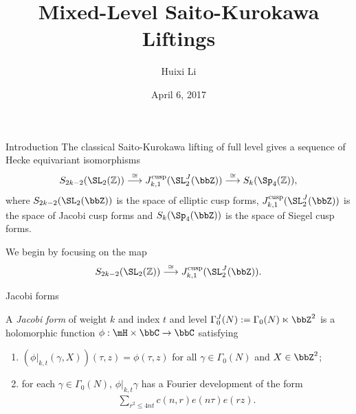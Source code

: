 \documentclass[mathserif,12pt]{beamer}
\title{Mixed-Level Saito-Kurokawa Liftings}
\author{Huixi Li}
\institute{Clemson University}
\date{April 6, 2017}
\begin{document}
\begin{frame}
\maketitle
\end{frame}

\begin{frame}{Introduction}
The classical Saito-Kurokawa lifting of full level gives a sequence of Hecke equivariant isomorphisms
\begin{equation*}
S_{2k - 2}(\SL_2(\mathbb{Z})) \overset{\cong}{\longrightarrow} J_{k,1}^{\text{cusp}}(\SL_2^J(\bbZ)) \overset{\cong}{\longrightarrow} S_k(\Sp_4(\mathbb{Z})),
\end{equation*}
where $S_{2k - 2}(\SL_2(\bbZ))$ is the space of elliptic cusp forms, $J_{k, 1}^{\text{cusp}} (\SL_2^J(\bbZ))$ is the space of Jacobi
cusp forms and $S_k(\Sp_4(\bbZ))$ is the space of Siegel cusp forms. \\[0.2in]

\pause

We begin by focusing on the map
\begin{equation*}
S_{2k - 2}(\SL_2(\mathbb{Z})) \overset{\cong}{\longrightarrow} J_{k,1}^{\text{cusp}}(\SL_2^J(\bbZ)).
\end{equation*}
\end{frame}

\begin{frame}{Jacobi forms}

\begin{definition}
A {\em Jacobi form} of weight $k$ and index $t$ and level $\Gamma_0^J(N) : = \Gamma_0(N) \ltimes \bbZ^2$ is a holomorphic function $\phi : \mH \times \bbC
\rightarrow \bbC$ satisfying \pause

\begin{enumerate}
\item $(\phi|_{k, t} (\gamma, X)) (\tau, z)= \phi(\tau, z)$ for all $\gamma \in \Gamma_0(N)$ and $X \in \bbZ^2$; \pause
\item for each $\gamma \in \Gamma_0(N)$, $\phi|_{k, t}\gamma$ has a Fourier development of the form
\begin{align*}
\sum_{r^2 \leq 4nt} c(n, r) e(n \tau) e(r z).
\end{align*}

\end{enumerate}
\end{definition}
\end{frame}
\end{document}
